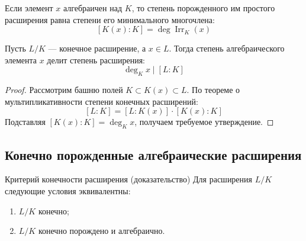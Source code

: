 \begin{Corollary}{}{}
	Если элемент $x$ алгебраичен над $K$, то степень порожденного им простого расширения равна степени его минимального многочлена:
	\[ [K(x):K] = \deg \operatorname{Irr}_K(x) \]
\end{Corollary}

\begin{Corollary}{}{}
	Пусть $L/K$ --- конечное расширение, а $x \in L$. Тогда степень алгебраического элемента $x$ делит степень расширения:
	\[ \deg_K x \mid [L:K] \]
\end{Corollary}

\begin{proof}
	Рассмотрим башню полей $K \subset K(x) \subset L$.
	По теореме о мультипликативности степени конечных расширений:
	\[ [L:K] = [L:K(x)] \cdot [K(x):K] \]
	Подставляя $[K(x):K] = \deg_K x$, получаем требуемое утверждение.
\end{proof}

\subsection{Конечно порожденные алгебраические расширения}

\begin{Theorem}{Критерий конечности расширения (доказательство)}{}
	Для расширения $L/K$ следующие условия эквивалентны:
	\begin{enumerate}
		\item $L/K$ конечно;
		\item $L/K$ конечно порождено и алгебраично.
	\end{enumerate}
\end{Theorem}

